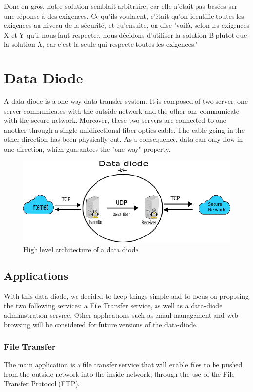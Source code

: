 \documentclass[a4paper,11pt]{article}
\begin{document}
Donc en gros, notre solution semblait arbitraire, car elle n'était pas basées sur une réponse à des exigences. Ce qu'ils voulaient, c'était qu'on identifie toutes les exigences au niveau de la sécurité, et qu'ensuite, on dise "voilà, selon les exigences X et Y qu'il nous faut respecter, nous décidons d'utiliser la solution B plutot que la solution A, car c'est la seule qui respecte toutes les exigences."




\section{Data Diode}
\label{sec:data-diode}
A data diode is a one-way data transfer system. It is composed of two server: one server communicates with the outside network and the other one communicate with the secure network. Moreover, these two servers are connected to one another through a single unidirectional fiber optics cable. The cable going in the other direction has been physically cut. As a consequence, data can only flow in one direction, which guarantees the "one-way" property.

\begin{figure}
	\includegraphics[scale=0.7]{img/network.png}
	\caption{High level architecture of a data diode.}
\end{figure}

\subsection{Applications}
With this data diode, we decided to keep things simple and to focus on proposing the two following services: a File Transfer service, as well as a data-diode administration service. 
Other applications such as email management and web browsing will be considered for future versions of the data-diode.

\subsubsection{File Transfer}
The main application is a file transfer service that will enable files to be pushed from the outside network into the inside network, through the use of the File Transfer Protocol (FTP).\\
\end{document}
